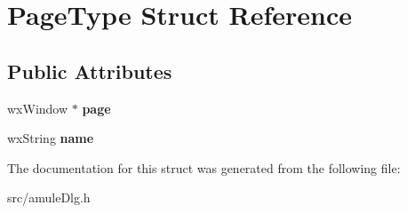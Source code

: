 \section{PageType Struct Reference}
\label{structPageType}
\subsection*{Public Attributes}
\begin{DoxyCompactItemize}
\item 
wxWindow $\ast$ {\bfseries page}\label{structPageType_adc2c27e8326067ad3cc5c45b6192c26a}

\item 
wxString {\bfseries name}\label{structPageType_aa48710c8d57f5fc8ddd878f685ac3f80}

\end{DoxyCompactItemize}


The documentation for this struct was generated from the following file:\begin{DoxyCompactItemize}
\item 
src/amuleDlg.h\end{DoxyCompactItemize}
